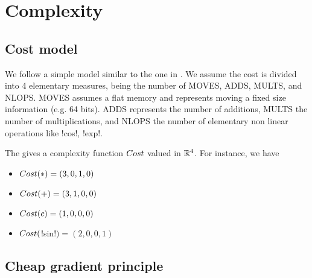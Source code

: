 \section{Complexity}
\label{sec:complexity}

\subsection{Cost model}

We follow a simple model similar to the one in \cite{griewank2008evaluating}.
We assume the cost is divided into 4 elementary measures, being the number of MOVES, ADDS, MULTS, and NLOPS.
MOVES assumes a flat memory and represents moving a fixed size information  (e.g. 64 bits). 
ADDS represents the number of additions, 
MULTS the number of multiplications, 
and NLOPS the number of elementary non linear operations like !cos!, !exp!.

The gives a complexity function $Cost$ valued in $\mathbb{R}^4$. 
For instance, we have 

\begin{itemize}
    \item $Cost(*)=(3,0,1,0)$
    \item $Cost(+)=(3,1,0,0)$
    \item $Cost(c)=(1,0,0,0)$
    \item $Cost($!sin!$)=(2,0,0,1)$
\end{itemize}



\subsection{Cheap gradient principle}
